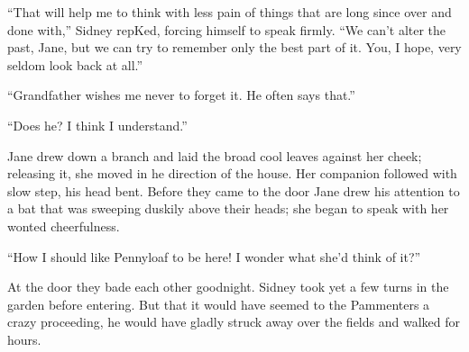 ``That will help me to think with less {}pain of things that are long
since over and done with,'' Sidney repKed, forcing himself to speak
firmly. ``We can't alter the past, Jane, but we can try to remember only
the best part of it. You, I hope, very seldom look back at all.''

``Grandfather wishes me never to forget it. He often says that.''

``Does he? I think I understand.''

Jane drew down a branch and laid the broad cool leaves against her
cheek; releasing it, she moved in he direction of the house. Her
companion followed with slow step, his head bent. Before they came to
the door Jane drew his attention to a bat that was sweeping duskily
above their heads; she began to speak with her wonted cheerfulness.

``How I should like Pennyloaf to be here! I wonder what she'd think of
it?''

At the door they bade each other goodnight. Sidney took yet a few turns
in the garden before entering. But that it would have seemed to the
Pammenters a crazy proceeding, he would have gladly struck away over the
fields and walked for hours.
